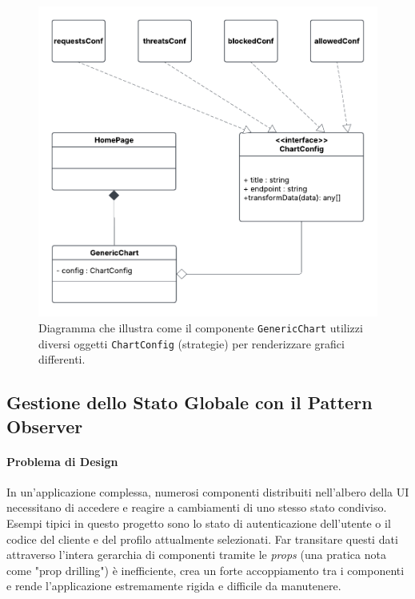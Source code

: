 \documentclass[12pt,a4paper,openright,twoside]{book}
\begin{document}
\begin{figure}[H]
    \centering
    \includegraphics[width=\textwidth]{figures/strategy.pdf}
    \caption{Diagramma che illustra come il componente \texttt{GenericChart} utilizzi diversi oggetti \texttt{ChartConfig} (strategie) per renderizzare grafici differenti.}
    \label{fig:strategy_frontend_uml}
\end{figure}



\subsection{Gestione dello Stato Globale con il Pattern Observer}
\label{subsec:design_observer_frontend}

\paragraph{Problema di Design}
In un'applicazione complessa, numerosi componenti distribuiti nell'albero della UI necessitano di accedere e reagire a cambiamenti di uno stesso stato condiviso. Esempi tipici in questo progetto sono lo stato di autenticazione dell'utente o il codice del cliente e del profilo attualmente selezionati. Far transitare questi dati attraverso l'intera gerarchia di componenti tramite le \textit{props} (una pratica nota come "prop drilling") è inefficiente, crea un forte accoppiamento tra i componenti e rende l'applicazione estremamente rigida e difficile da manutenere.
\end{document}
